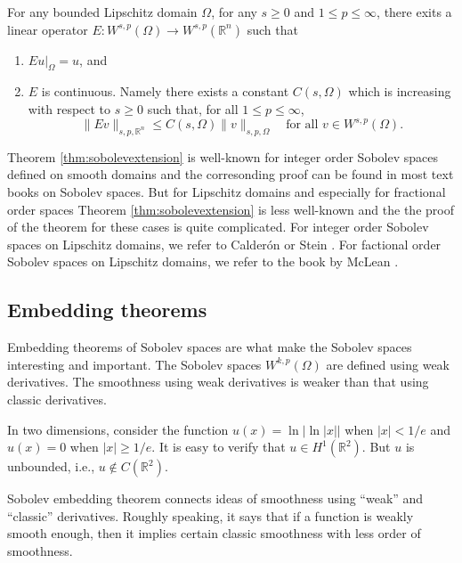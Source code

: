 \begin{theorem}\label{thm:sobolevextension}
For any bounded Lipschitz domain $\Omega$, for any $s\geq0$ and $1\leq p \leq \infty$,
there exits a linear operator $E : W^{s,p}(\Omega)\to W^{s,p}(\mathbb R^n)$ such that
\begin{enumerate}
\item $Eu|_{\Omega}= u$, and
\item $E$ is continuous. Namely there exists a constant $C(s, \Omega)$ which is increasing with respect to $s\geq0$ such that, for all $1\leq p \leq \infty$,
\[
\|Ev\|_{s,p,\mathbb R^n}\leq C(s,\Omega)\|v\|_{s,p,\Omega}\quad\textrm{for all }v\in W^{s,p}(\Omega).
\]
\end{enumerate}
\end{theorem}

Theorem \ref{thm:sobolevextension} is well-known for integer order Sobolev spaces defined on smooth domains
and the corresonding proof can be found in most text books on Sobolev spaces. But
for Lipschitz domains and especially for fractional order spaces Theorem \ref{thm:sobolevextension} is less well-known
and the the proof of the theorem for these cases is quite complicated. For integer
order Sobolev spaces on Lipschitz domains, we refer to Calder\'on \cite{Calderon1961} or Stein \cite{Stein1970}. For
factional order Sobolev spaces on Lipschitz domains, we refer to the book by McLean \cite{McLean2000}.


\subsection{Embedding theorems}
Embedding theorems of Sobolev spaces are what make the
Sobolev spaces interesting and important. The Sobolev spaces $W^{k,p}(\Omega)$ are defined using
weak derivatives. The smoothness using weak derivatives is weaker than that using classic
derivatives.

\begin{exm}\label{example:20180304-1}
In two dimensions, consider the function $u(x) = \ln|\ln|x||$ when $|x| <1/e$ and $u(x) = 0$ when $|x| \geq 1/e$. It is easy to verify that $u\in H^1(\mathbb R^2)$. But $u$ is unbounded, i.e., $u\notin C(\mathbb R^2)$.
\end{exm}

Sobolev embedding theorem connects ideas of smoothness using ``weak'' and ``classic''
derivatives. Roughly speaking, it says that if a function is weakly smooth enough, then it
implies certain classic smoothness with less order of smoothness.

